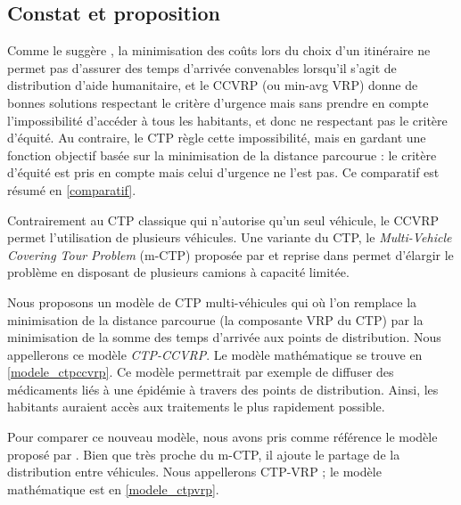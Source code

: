 \documentclass[5p,authoryear,square]{elsarticle}
\begin{document}
\subsection{Constat et proposition}
Comme le suggère \cite{campbell_routing_2008}, la minimisation des coûts lors du choix d’un itinéraire ne permet pas d’assurer des temps d’arrivée convenables lorsqu’il s’agit de distribution d’aide humanitaire, et le CCVRP (ou min-avg VRP) donne de bonnes solutions respectant le critère d'urgence mais sans prendre en compte l'impossibilité d'accéder à tous les habitants, et donc ne respectant pas le critère d'équité. Au contraire, le CTP règle cette impossibilité, mais en gardant une fonction objectif basée sur la minimisation de la distance parcourue : le critère d'équité est pris en compte mais celui d'urgence ne l'est pas. Ce comparatif est résumé en \cref{comparatif}.

Contrairement au CTP classique qui n'autorise qu'un seul véhicule, le CCVRP permet l'utilisation de plusieurs véhicules. Une variante du CTP, le \emph{Multi-Vehicle Covering Tour Problem} (m-CTP)  proposée par \cite{hachicha_heuristics_2000} et reprise dans \cite{naji-azimi_covering_2012} permet d'élargir le problème en disposant de plusieurs camions à capacité limitée.


Nous proposons un modèle de CTP multi-véhicules qui où l'on remplace la minimisation de la distance parcourue (la composante VRP du CTP) par la minimisation de la somme des temps d'arrivée aux points de distribution. Nous appellerons ce modèle \emph{CTP-CCVRP}. Le modèle mathématique se trouve en \cref{modele_ctpccvrp}. Ce modèle permettrait par exemple de diffuser des médicaments liés à une épidémie à travers des points de distribution. Ainsi, les habitants auraient accès aux traitements le plus rapidement possible.

Pour comparer ce nouveau modèle, nous avons pris comme référence le modèle proposé par \cite{naji-azimi_covering_2012}. Bien que très proche du m-CTP, il ajoute le partage de la distribution entre véhicules. Nous appellerons CTP-VRP ; le modèle mathématique est en \cref{modele_ctpvrp}.
\end{document}
